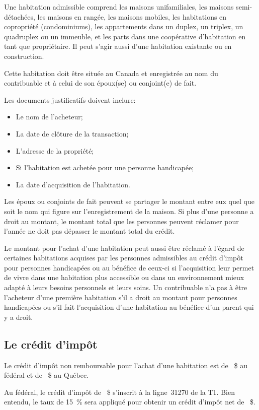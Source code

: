 Une \og habitation admissible \fg{} comprend les maisons unifamiliales, les maisons semi-détachées, les maisons en rangée, les maisons mobiles, les habitations en copropriété (condominiums), les appartements dans un duplex, un triplex, un quadruplex ou un immeuble, et les parts dans une coopérative d'habitation en tant que propriétaire. Il peut s'agir aussi d'une habitation existante ou en construction.

Cette habitation doit être située au Canada et enregistrée au nom du contribuable et à celui de son époux(se) ou conjoint(e) de fait.

Les documents justificatifs doivent inclure:
\begin{itemize}[label=]
	\item Le nom de l'acheteur;
	\item La date de clôture de la transaction;
	\item L'adresse de la propriété;
	\item Si l'habitation est achetée pour une personne handicapée;
	\item La date d'acquisition de l'habitation.
\end{itemize}

Les époux ou conjoints de fait peuvent se partager le montant entre eux quel que soit le nom qui figure sur l'enregistrement de la maison. Si plus d'une personne a droit au montant, le montant total que les personnes peuvent réclamer pour l'année ne doit pas dépasser le montant total du crédit.

Le montant pour l'achat d'une habitation peut aussi être réclamé à l'égard de certaines habitations acquises par les personnes admissibles au crédit d'impôt pour personnes handicapées ou au bénéfice de ceux-ci si l'acquisition leur permet de vivre dans une habitation plus accessible ou dans un environnement mieux adapté à leurs besoins personnels et leurs soins. Un contribuable n'a pas à être l'acheteur d'une première habitation s'il a droit au montant pour personnes handicapées ou s'il fait l'acquisition d'une habitation au bénéfice d'un parent qui y a droit.


\subsection{Le crédit d'impôt}
Le crédit d'impôt non remboursable pour l'achat d'une habitation est de ~\$ au fédéral et de ~\$ au Québec.

Au fédéral, le crédit d'impôt de ~\$ s'inscrit à la ligne~31270 de la T1. Bien entendu, le taux de 15~\% sera appliqué pour obtenir un crédit d'impôt net de ~\$.


